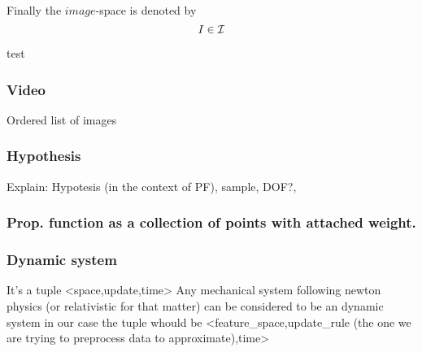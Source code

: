 Finally the $image$-space is denoted by
\begin{equation}
    I \in \mathcal{I}
\end{equation}

\begin{example}
    test
\end{example}

\subsubsection{Video}
Ordered list of images

\subsubsection{Hypothesis}
Explain: Hypotesis (in the context of PF), sample, DOF?, 

\subsubsection{Prop. function as a collection of points with attached weight.}


\subsubsection{Dynamic system}
    It's a tuple <space,update,time>
    Any mechanical system following newton physics (or relativistic for that matter) can be considered to be an dynamic system
    in our case the tuple whould be <feature\_space,update\_rule (the one we are trying to preprocess data to approximate),time>



